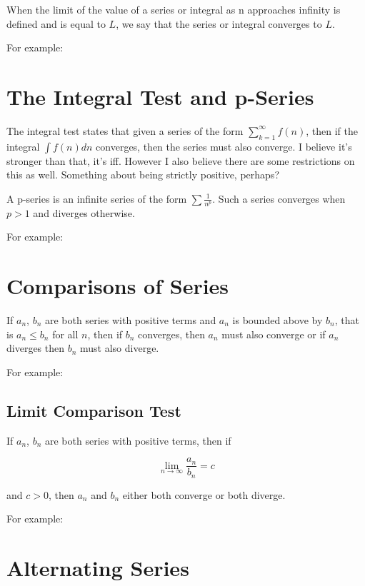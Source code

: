 \documentclass{article}
\newenvironment{correction}
{\color{green}}
{}
\begin{document}
When the limit of the value of a series or integral as n approaches
infinity is defined and is equal to $L$, we say that the series or
integral converges to $L$.

For example:

\section{The Integral Test and p-Series}

The integral test states that given a series of the form
$\displaystyle\sum^\infty_{k=1}f(n)$, then if the integral $\displaystyle\int f(n)dn$ converges,
then the series must also converge. \begin{correction}I believe it's stronger than that, it's iff. However I also believe there are some restrictions on this as well. Something about being strictly positive, perhaps?\end{correction}

A p-series is an infinite series of the form $\displaystyle\sum \frac{1}{n^p}$.
Such a series converges when $p > 1$ and diverges otherwise.

For example:

\section{Comparisons of Series}

If $a_n$, $b_n$ are both series with positive terms and $a_n$ is
bounded above by $b_n$, that is $a_n \leq b_n$ for all $n$, then if
$b_n$ converges, then $a_n$ must also converge or if $a_n$ diverges
then $b_n$ must also diverge.

For example:

\subsection{Limit Comparison Test}

If $a_n$, $b_n$ are both series with positive terms, then if

\[
\lim_{n \to \infty} \frac{a_n}{b_n} = c
\]

and $c > 0$, then $a_n$ and $b_n$ either both converge or both diverge.

For example:

\section{Alternating Series}
\end{document}
